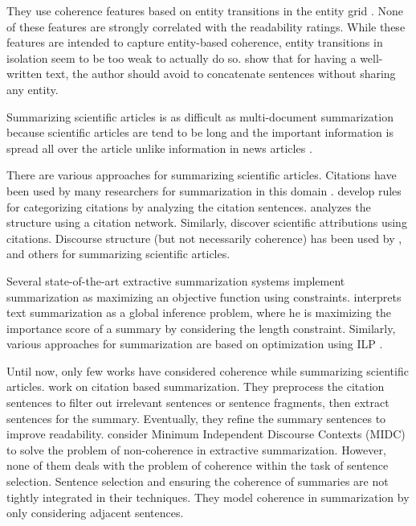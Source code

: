 They use coherence features based on entity transitions in the entity grid \cite{barzilay08}. 
None of these features are strongly correlated with the readability ratings. While these features are intended to capture entity-based coherence, entity transitions in isolation seem to be too weak to actually do so. 
 show that for having a well-written text, the author should avoid to concatenate sentences without sharing any entity.

Summarizing scientific articles is as difficult as multi-document summarization because scientific articles are tend to be long and the important information is spread all over the article unlike information in news articles \cite{teufel02}.

There are various approaches for summarizing scientific articles. Citations have been used by many researchers for summarization in this domain \cite{elkiss08,mohammad09,qazvinian08,abu-jbara11}.  develop rules for categorizing citations by analyzing the citation sentences.  analyzes the structure using a citation network. Similarly,  discover scientific attributions using citations. Discourse structure (but not necessarily coherence) has been used by ,  and others for summarizing scientific articles.

Several state-of-the-art extractive summarization systems implement summarization as maximizing an objective function using constraints.
 interprets text summarization as a global inference problem, where he is maximizing the importance score of a summary by considering the length constraint. Similarly, various approaches for summarization are based on optimization using ILP  \cite{gillick09,nishikawa10,galanis12,parveen15a}.

Until now, only few works have considered coherence while summarizing scientific articles.  work on citation based summarization. They preprocess the citation sentences to filter out irrelevant sentences or sentence fragments, then extract sentences for the summary. Eventually, they refine the summary sentences to improve readability.
 consider Minimum Independent Discourse Contexts (MIDC) to solve the problem of non-coherence in extractive summarization.
However, none of them deals with the problem of coherence within the task of sentence selection. Sentence selection and ensuring the coherence of summaries
are not tightly integrated in their techniques. They model coherence in summarization by only considering adjacent sentences.

